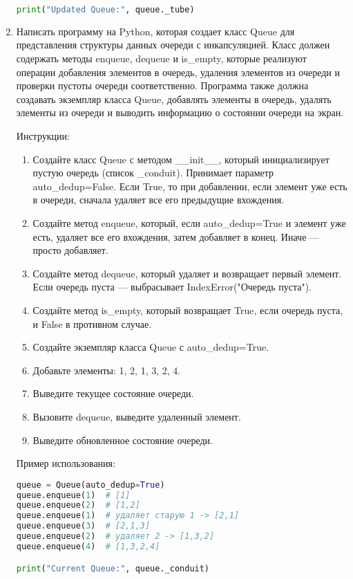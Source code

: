 \begin{enumerate}
\begin{lstlisting}[language=Python]
print("Updated Queue:", queue._tube)
\end{lstlisting}

\item Написать программу на Python, которая создает класс Queue для представления структуры данных очереди с инкапсуляцией. Класс должен содержать методы enqueue, dequeue и is\_empty, которые реализуют операции добавления элементов в очередь, удаления элементов из очереди и проверки пустоты очереди соответственно. Программа также должна создавать экземпляр класса Queue, добавлять элементы в очередь, удалять элементы из очереди и выводить информацию о состоянии очереди на экран.

Инструкции:
\begin{enumerate}
    \item Создайте класс Queue с методом \_\_init\_\_, который инициализирует пустую очередь (список \_conduit). Принимает параметр auto\_dedup=False. Если True, то при добавлении, если элемент уже есть в очереди, сначала удаляет все его предыдущие вхождения.
    \item Создайте метод enqueue, который, если auto\_dedup=True и элемент уже есть, удаляет все его вхождения, затем добавляет в конец. Иначе — просто добавляет.
    \item Создайте метод dequeue, который удаляет и возвращает первый элемент. Если очередь пуста — выбрасывает IndexError("Очередь пуста").
    \item Создайте метод is\_empty, который возвращает True, если очередь пуста, и False в противном случае.
    \item Создайте экземпляр класса Queue с auto\_dedup=True.
    \item Добавьте элементы: 1, 2, 1, 3, 2, 4.
    \item Выведите текущее состояние очереди.
    \item Вызовите dequeue, выведите удаленный элемент.
    \item Выведите обновленное состояние очереди.
\end{enumerate}

Пример использования:
\begin{lstlisting}[language=Python]
queue = Queue(auto_dedup=True)
queue.enqueue(1)  # [1]
queue.enqueue(2)  # [1,2]
queue.enqueue(1)  # удаляет старую 1 -> [2,1]
queue.enqueue(3)  # [2,1,3]
queue.enqueue(2)  # удаляет 2 -> [1,3,2]
queue.enqueue(4)  # [1,3,2,4]

print("Current Queue:", queue._conduit)


\end{lstlisting}
\end{enumerate}
